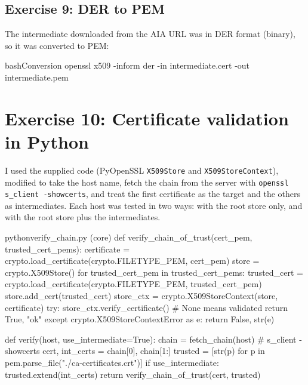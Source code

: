         \subsection{Exercise 9: DER to PEM}

            The intermediate downloaded from the AIA URL was in DER format (binary), so it was
            converted to PEM:

            \begin{codeblock}[]{bash}{Conversion}
                openssl x509 -inform der -in intermediate.cert -out intermediate.pem
            \end{codeblock}

    \section{Exercise 10: Certificate validation in Python}

        I used the supplied code (PyOpenSSL \texttt{X509Store} and \texttt{X509StoreContext}),
        modified to take the host name, fetch the chain from the server with
        \texttt{openssl s\_client -showcerts}, and treat the first certificate as the target and the
        others as intermediates. Each host was tested in two ways: with the root store
        only, and with the root store plus the intermediates.

        \begin{codeblock}[]{python}{verify\_chain.py (core)}
            def verify_chain_of_trust(cert_pem, trusted_cert_pems):
                certificate = crypto.load_certificate(crypto.FILETYPE_PEM, cert_pem)
                store = crypto.X509Store()
                for trusted_cert_pem in trusted_cert_pems:
                    trusted_cert = crypto.load_certificate(crypto.FILETYPE_PEM, trusted_cert_pem)
                    store.add_cert(trusted_cert)
                store_ctx = crypto.X509StoreContext(store, certificate)
                try:
                    store_ctx.verify_certificate()   # None means validated
                    return True, "ok"
                except crypto.X509StoreContextError as e:
                    return False, str(e)

            def verify(host, use_intermediate=True):
                chain = fetch_chain(host)               # s_client -showcerts
                cert, int_certs = chain[0], chain[1:]
                trusted = [str(p) for p in pem.parse_file("./ca-certificates.crt")]
                if use_intermediate:
                    trusted.extend(int_certs)
                return verify_chain_of_trust(cert, trusted)
        \end{codeblock}

